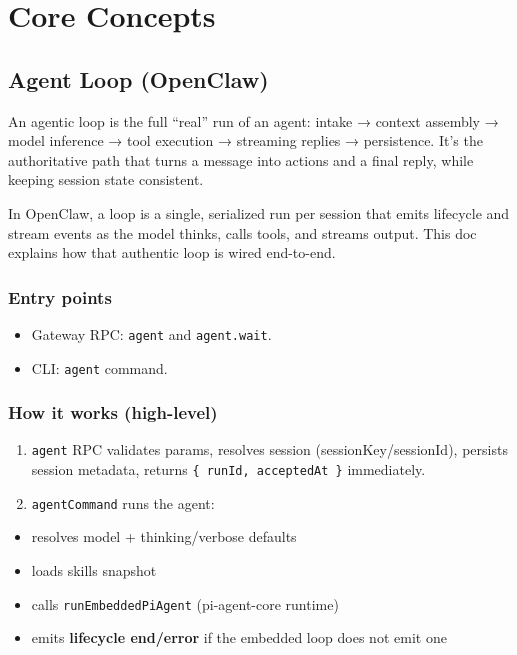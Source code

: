 \chapter{Core Concepts}

\section{Agent Loop (OpenClaw)}


An agentic loop is the full “real” run of an agent: intake → context assembly → model inference →
tool execution → streaming replies → persistence. It’s the authoritative path that turns a message
into actions and a final reply, while keeping session state consistent.

In OpenClaw, a loop is a single, serialized run per session that emits lifecycle and stream events
as the model thinks, calls tools, and streams output. This doc explains how that authentic loop is
wired end-to-end.

\subsection{Entry points}


\begin{itemize}
  \item Gateway RPC: \texttt{agent} and \texttt{agent.wait}.
  \item CLI: \texttt{agent} command.
\end{itemize}


\subsection{How it works (high-level)}


\begin{enumerate}
  \item \texttt{agent} RPC validates params, resolves session (sessionKey/sessionId), persists session metadata, returns \texttt{\{ runId, acceptedAt \}} immediately.
  \item \texttt{agentCommand} runs the agent:
\end{enumerate}

\begin{itemize}
  \item resolves model + thinking/verbose defaults
  \item loads skills snapshot
  \item calls \texttt{runEmbeddedPiAgent} (pi-agent-core runtime)
  \item emits \textbf{lifecycle end/error} if the embedded loop does not emit one
\end{itemize}

